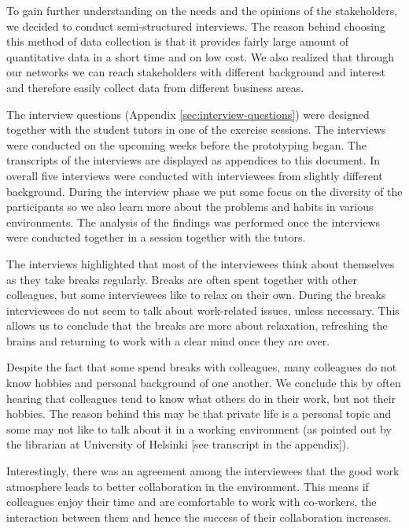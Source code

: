 To gain further understanding on the needs and the opinions of the stakeholders, we decided to conduct semi-structured interviews. The reason behind choosing this method of data collection is that it provides fairly large amount of quantitative data in a short time and on low cost. We also realized that through our networks we can reach stakeholders with different background and interest and therefore easily collect data from different business areas. 

The interview questions (Appendix \ref{sec:interview-questions}) were designed together with the student tutors in one of the exercise sessions. The interviews were conducted on the upcoming weeks before the prototyping began. The transcripts of the interviews are displayed as appendices to this document. In overall five interviews were conducted with interviewees from slightly different background. During the interview phase we put some focus on the diversity of the participants so we also learn more about the problems and habits in various environments. The analysis of the findings was performed once the interviews were conducted together in a session together with the tutors.

The interviews highlighted that most of the interviewees think about themselves as they take breaks regularly. Breaks are often spent together with other colleagues, but some interviewees like to relax on their own. During the breaks interviewees do not seem to talk about work-related issues, unless necessary. This allows us to conclude that the breaks are more about relaxation, refreshing the brains and returning to work with a clear mind once they are over. 

Despite the fact that some spend breaks with colleagues, many colleagues do not know hobbies and personal background of one another. We conclude this by often hearing that colleagues tend to know what others do in their work, but not their hobbies. The reason behind this may be that private life is a personal topic and some may not like to talk about it in a working environment (as pointed out by the librarian at University of Helsinki [see transcript in the appendix]). 

Interestingly, there was an agreement among the interviewees that the good work atmosphere leads to better collaboration in the environment. This means if colleagues enjoy their time and are comfortable to work with co-workers, the interaction between them and hence the success of their collaboration increases. 
